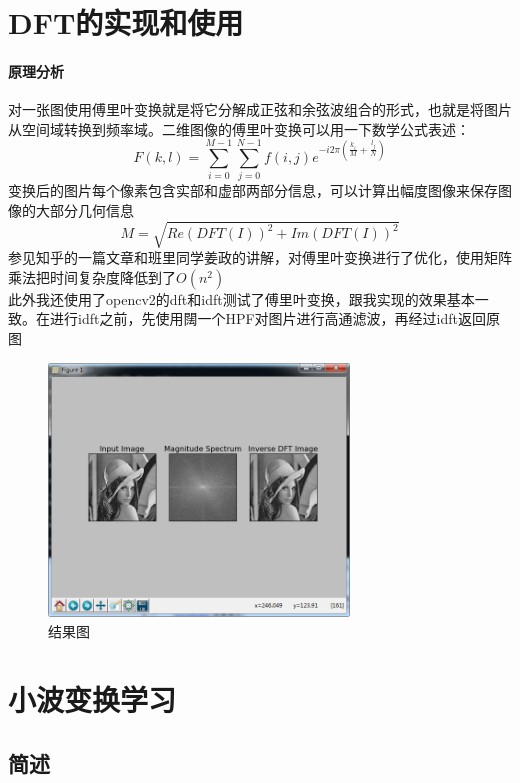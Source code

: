 \documentclass{article}
\begin{document}
    \section{DFT的实现和使用}
    \paragraph{原理分析}
        对一张图使用傅里叶变换就是将它分解成正弦和余弦波组合的形式，也就是将图片从空间域转换到频率域。二维图像的傅里叶变换可以用一下数学公式表述：
        \begin{equation}
            F(k,l)=\sum_{i=0}^{M-1}\sum_{j=0}^{N-1}f(i,j)e^{-i2\pi(\frac{k_{i}}{M}+\frac{l_{j}}{N})}
        \end{equation}
        变换后的图片每个像素包含实部和虚部两部分信息，可以计算出幅度图像来保存图像的大部分几何信息
        \begin{equation*}
        M = \sqrt{Re(DFT(I))^2+Im(DFT(I))^2}
        \end{equation*}
        参见知乎的一篇文章和班里同学姜政的讲解，对傅里叶变换进行了优化，使用矩阵乘法把时间复杂度降低到了$O(n^2)$\\
        此外我还使用了opencv2的dft和idft测试了傅里叶变换，跟我实现的效果基本一致。在进行idft之前，先使用䦢一个HPF对图片进行高通滤波，再经过idft返回原图
         \begin{figure}[htbp]
                \begin{minipage}[t]{1\linewidth}\centering
                \includegraphics[width=8cm]{result.png}
                \caption{结果图}\label{1-a}
                \end{minipage}
        \end{figure}
    \section{小波变换学习}
        \subsection{简述}
\end{document}
